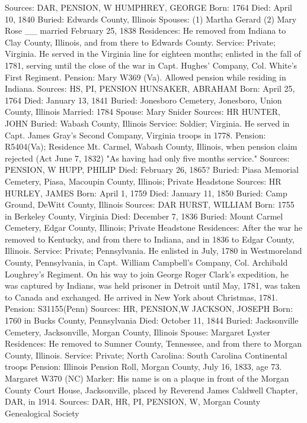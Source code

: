 Sources: DAR, PENSION, W 
HUMPHREY, GEORGE 
Born: 1764 
Died: April 10, 1840 
Buried: Edwards County, Illinois 
Spouses: (1) Martha Gerard 
	 (2) Mary Rose __ married February 25, 1838 
Residences: He removed from Indiana to Clay County, Illinois, and from there to Edwards County. 
Service: Private; Virginia. He served in the Virginia line for eighteen months; enlisted in the fall of 1781, serving until the close of the war in Capt. Hughes' Company, Col. White's First Regiment. 
Pension: Mary W369 (Va). Allowed pension while residing in Indiana. 
Sources: HS, PI, PENSION 
HUNSAKER, ABRAHAM 
Born: April 25, 1764 
Died: January 13, 1841 
Buried: Jonesboro Cemetery, Jonesboro, Union County, Illinois 
Married: 1784 
Spouse: Mary Snider 
Sources: HR 
HUNTER, JOHN 
Buried: Wabash County, Illinois 
Service: Soldier; Virginia. He served in Capt. James Gray's Second Company, Virginia troops in 1778. Pension: R5404(Va); Residence Mt. Carmel, Wabash County, Illinois, when pen­sion claim rejected (Act June 7, 1832) "As having had only five months service." 
Sources: PENSION, W 
HUPP, PHILIP 
Died: February 26, 1865? 
Buried: Piasa Memorial Cemetery, Piasa, Macoupin County, Illinois; Private Headstone 
Sources: HR 
HURLEY, JAMES 
Born: April 1, 1759 
Died: January 11, 1850 
Buried: Camp Ground, DeWitt County, Illinois 
Sources: DAR 
HURST, WILLIAM 
Born: 1755 in Berkeley County, Virginia 
Died: December 7, 1836 
Buried: Mount Carmel Cemetery, Edgar County, Illinois; Private Headstone 
Residences: After the war he removed to Kentucky, and from there to Indiana, and in 1836 to Edgar County, Illinois. 
Service: Private; Pennsylvania. He enlisted in July, 1780 in Westmoreland County, Pennsylvania, in Capt. William Campbell's Company, Col. Archibald Lough­rey's Regiment. On his way to join George Roger Clark's expedition, he was captured by Indians, was held prisoner in Detroit until May, 1781, was taken to Canada and exchanged. He arrived in New York about Christmas, 1781. 
Pension: S31155(Penn) 
Sources: HR, PENSION,W 
JACKSON, JOSEPH 
Born: 1760 in Bucks County, Pennsylvania 
Died: October 11, 1844 
Buried: Jacksonville Cemetery, Jacksonville, Morgan County, Illinois 
Spouse: Margaret Lyster Residences: He removed to Sumner County, Tennessee, and from there to Mor­gan County, Illinois.
Service: Private; North Carolina: South Carolina Continental troops 
Pension: Illinois Pension Roll, Morgan County, July 16, 1833, age 73. Margaret W370 (NC) 
Marker: His name is on a plaque in front of the Morgan County Court House, Jacksonville, placed by Reverend James Caldwell Chapter, DAR, in 1914. 
Sources: DAR, HR, PI, PENSION, W, Morgan County Genealogical Society 

